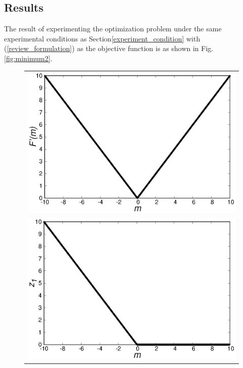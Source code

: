 \documentclass[fp,twocolumn]{jpsj3}
\begin{document}
\subsection{Results} %
The result of experimenting the optimization problem under the same experimental conditions as Section\ref{experiment_condition} with (\ref{review_formulation}) as the objective function is as shown in Fig.\ref{fig:minimum2}.
\begin{figure}[htbp]
  \begin{center}
    \begin{tabular}{c}
      \begin{minipage}{0.50\hsize}
        \centering
        \includegraphics[keepaspectratio,scale=0.33]{minimum_cost_non_t.eps}
      \end{minipage} \\
      \begin{minipage}{0.50\hsize}
        \centering
        \includegraphics[keepaspectratio,scale=0.33]{minimum_z1_non_t.eps}

\end{minipage}
\end{tabular}
\end{center}
\end{figure}
\end{document}
